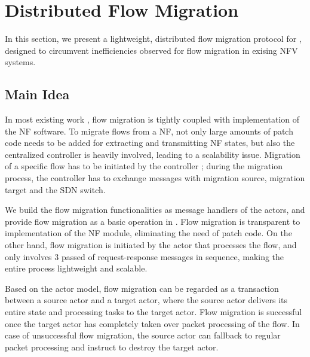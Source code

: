 \section{Distributed Flow Migration}
\label{sec:fm}

In this section, we present a lightweight, distributed flow migration protocol for \nfactor, designed to circumvent inefficiencies observed for flow migration in exising NFV systems. 

\subsection{Main Idea}

In most existing work \cite{gember2015opennf, rajagopalan2013split}, flow migration is tightly coupled with implementation of the NF software. To migrate flows from a NF, not only large amounts of patch code needs to be added for extracting and transmitting NF states, but also the centralized controller is heavily involved, leading to a scalability issue. Migration of a specific flow has to be initiated by the controller \cite{gember2015opennf}; during the migration process, the controller has to exchange messages with migration source, migration target and the SDN switch. 


We build the flow migration functionalities as message handlers of the actors, and provide flow migration as a basic operation in \nfactor. Flow migration is transparent to implementation of the NF module, eliminating the need of patch code. On the other hand, flow migration is initiated by the actor that processes the flow, and only involves 3 passed of request-response messages in sequence, making the entire process lightweight and scalable. 

Based on the actor model, flow migration can be regarded as a transaction between a source actor and a target actor, where the source actor delivers its entire state and processing tasks to the target actor. Flow migration is successful once the target actor has completely taken over packet processing of the flow. %
 In case of unsuccessful flow migration, the source actor can fallback to regular packet processing and instruct to destroy the target actor.
 


